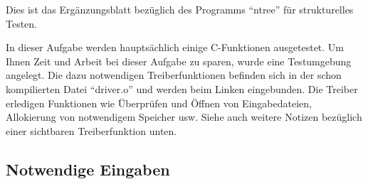 
Dies ist das Erg\"anzungsblatt bez\"uglich des Programms "`ntree"'
f\"ur strukturelles Testen.

\bigskip

In dieser Aufgabe werden haupts\"achlich einige C-Funktionen
ausgetestet.  
Um Ihnen Zeit und Arbeit bei dieser
Aufgabe zu sparen, wurde eine Testumgebung angelegt.  Die dazu notwendigen
Treiberfunktionen befinden sich in der schon kompilierten Datei
"`driver.o"' und werden beim Linken eingebunden.  
Die Treiber erledigen Funktionen wie \"Uberpr\"ufen und \"Offnen von
Eingabedateien, Allokierung von notwendigem Speicher usw.  Siehe auch
weitere Notizen bez\"uglich einer sichtbaren Treiberfunktion unten.

\subsection*{Notwendige Eingaben}

